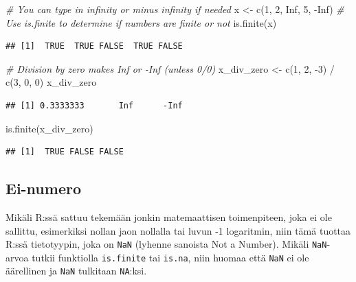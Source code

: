 \documentclass[
]{book}
\newenvironment{Shaded}{\begin{snugshade}}{\end{snugshade}}
\newcommand{\CommentTok}[1]{\textcolor[rgb]{0.56,0.35,0.01}{\textit{#1}}}
\newcommand{\ConstantTok}[1]{\textcolor[rgb]{0.00,0.00,0.00}{#1}}
\newcommand{\DecValTok}[1]{\textcolor[rgb]{0.00,0.00,0.81}{#1}}
\newcommand{\FunctionTok}[1]{\textcolor[rgb]{0.00,0.00,0.00}{#1}}
\newcommand{\NormalTok}[1]{#1}
\newcommand{\OtherTok}[1]{\textcolor[rgb]{0.56,0.35,0.01}{#1}}
\newcommand{\SpecialCharTok}[1]{\textcolor[rgb]{0.00,0.00,0.00}{#1}}
\begin{document}
\begin{Shaded}
\begin{Highlighting}[]
\CommentTok{\# You can type in infinity or minus infinity if needed}
\NormalTok{x }\OtherTok{\textless{}{-}} \FunctionTok{c}\NormalTok{(}\DecValTok{1}\NormalTok{, }\DecValTok{2}\NormalTok{, }\ConstantTok{Inf}\NormalTok{, }\DecValTok{5}\NormalTok{, }\SpecialCharTok{{-}}\ConstantTok{Inf}\NormalTok{)}
\CommentTok{\# Use is.finite to determine if numbers are finite or not}
\FunctionTok{is.finite}\NormalTok{(x)}
\end{Highlighting}
\end{Shaded}

\begin{verbatim}
## [1]  TRUE  TRUE FALSE  TRUE FALSE
\end{verbatim}

\begin{Shaded}
\begin{Highlighting}[]
\CommentTok{\# Division by zero makes Inf or {-}Inf (unless 0/0)}
\NormalTok{x\_div\_zero }\OtherTok{\textless{}{-}} \FunctionTok{c}\NormalTok{(}\DecValTok{1}\NormalTok{, }\DecValTok{2}\NormalTok{, }\SpecialCharTok{{-}}\DecValTok{3}\NormalTok{) }\SpecialCharTok{/} \FunctionTok{c}\NormalTok{(}\DecValTok{3}\NormalTok{, }\DecValTok{0}\NormalTok{, }\DecValTok{0}\NormalTok{)}
\NormalTok{x\_div\_zero}
\end{Highlighting}
\end{Shaded}

\begin{verbatim}
## [1] 0.3333333       Inf      -Inf
\end{verbatim}

\begin{Shaded}
\begin{Highlighting}[]
\FunctionTok{is.finite}\NormalTok{(x\_div\_zero)}
\end{Highlighting}
\end{Shaded}

\begin{verbatim}
## [1]  TRUE FALSE FALSE
\end{verbatim}

\hypertarget{ei-numero}{%
\subsection{Ei-numero}\label{ei-numero}}

Mikäli R:ssä sattuu tekemään jonkin matemaattisen toimenpiteen, joka ei ole sallittu, esimerkiksi nollan jaon nollalla tai luvun -1 logaritmin, niin tämä tuottaa R:ssä tietotyypin, joka on \texttt{NaN} (lyhenne sanoista Not a Number). Mikäli \texttt{NaN}-arvoa tutkii funktiolla \texttt{is.finite} tai \texttt{is.na}, niin huomaa että \texttt{NaN} ei ole äärellinen ja \texttt{NaN} tulkitaan \texttt{NA}:ksi.
\end{document}

